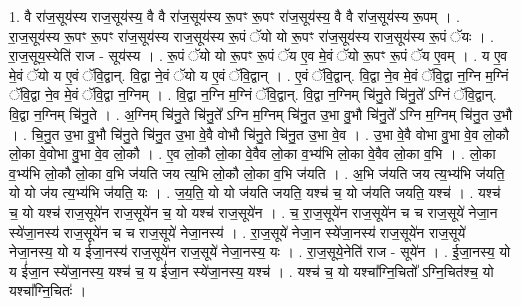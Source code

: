\documentclass[17pt]{extarticle}
\begin{document}
1. वै रा॑ज॒सूय॑स्य राज॒सूय॑स्य॒ वै वै रा॑ज॒सूय॑स्य रू॒पꣳ रू॒पꣳ रा॑ज॒सूय॑स्य॒ वै वै रा॑ज॒सूय॑स्य रू॒पम् । . रा॒ज॒सूय॑स्य रू॒पꣳ रू॒पꣳ रा॑ज॒सूय॑स्य राज॒सूय॑स्य रू॒पं ॅयो यो रू॒पꣳ रा॑ज॒सूय॑स्य राज॒सूय॑स्य रू॒पं ॅयः । . रा॒ज॒सूय॒स्येति॑ राज - सूय॑स्य । . रू॒पं ॅयो यो रू॒पꣳ रू॒पं ॅय ए॒व मे॒वं ॅयो रू॒पꣳ रू॒पं ॅय ए॒वम् । . य ए॒व मे॒वं ॅयो य ए॒वं ॅवि॒द्वान्. वि॒द्वा ने॒वं ॅयो य ए॒वं ॅवि॒द्वान् । . ए॒वं ॅवि॒द्वान्. वि॒द्वा ने॒व मे॒वं ॅवि॒द्वा न॒ग्नि म॒ग्निं ॅवि॒द्वा ने॒व मे॒वं ॅवि॒द्वा न॒ग्निम् । . वि॒द्वा न॒ग्नि म॒ग्निं ॅवि॒द्वान्. वि॒द्वा न॒ग्निम् चि॑नु॒ते चि॑नु॒ते᳚ ऽग्निं ॅवि॒द्वान्. वि॒द्वा न॒ग्निम् चि॑नु॒ते । . अ॒ग्निम् चि॑नु॒ते चि॑नु॒ते᳚ ऽग्नि म॒ग्निम् चि॑नु॒त उ॒भा वु॒भौ चि॑नु॒ते᳚ ऽग्नि म॒ग्निम् चि॑नु॒त उ॒भौ । . चि॒नु॒त उ॒भा वु॒भौ चि॑नु॒ते चि॑नु॒त उ॒भा वे॒वै वोभौ चि॑नु॒ते चि॑नु॒त उ॒भा वे॒व । . उ॒भा वे॒वै वोभा वु॒भा वे॒व लो॒कौ लो॒का वे॒वोभा वु॒भा वे॒व लो॒कौ । . ए॒व लो॒कौ लो॒का वे॒वैव लो॒का व॒भ्य॑भि लो॒का वे॒वैव लो॒का व॒भि । . लो॒का व॒भ्य॑भि लो॒कौ लो॒का व॒भि ज॑यति जय त्य॒भि लो॒कौ लो॒का व॒भि ज॑यति । . अ॒भि ज॑यति जय त्य॒भ्य॑भि ज॑यति॒ यो यो ज॑य त्य॒भ्य॑भि ज॑यति॒ यः । . ज॒य॒ति॒ यो यो ज॑यति जयति॒ यश्च॑ च॒ यो ज॑यति जयति॒ यश्च॑ । . यश्च॑ च॒ यो यश्च॑ राज॒सूये॑न राज॒सूये॑न च॒ यो यश्च॑ राज॒सूये॑न । . च॒ रा॒ज॒सूये॑न राज॒सूये॑न च च राज॒सूये॑ नेजा॒न स्ये॑जा॒नस्य॑ राज॒सूये॑न च च राज॒सूये॑ नेजा॒नस्य॑ । . रा॒ज॒सूये॑ नेजा॒न स्ये॑जा॒नस्य॑ राज॒सूये॑न राज॒सूये॑ नेजा॒नस्य॒ यो य ई॑जा॒नस्य॑ राज॒सूये॑न राज॒सूये॑
नेजा॒नस्य॒ यः । . रा॒ज॒सूये॒नेति॑ राज - सूये॑न । . ई॒जा॒नस्य॒ यो य ई॑जा॒न स्ये॑जा॒नस्य॒ यश्च॑ च॒ य ई॑जा॒न स्ये॑जा॒नस्य॒ यश्च॑ । . यश्च॑ च॒ यो यश्चा᳚ग्नि॒चितो᳚ ऽग्नि॒चित॑श्च॒ यो यश्चा᳚ग्नि॒चितः॑ । \newline
\end{document}

